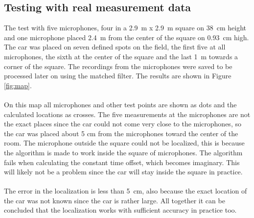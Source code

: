 \documentclass[final]{scrreprt} %
\begin{document}
\subsection{Testing with real measurement data}
The test with five microphones, four in a \SI{2.9}{\metre} x \SI{2.9}{\metre} square on \SI{38}{\centi\metre} height and one microphone placed \SI{2.4}{\metre} from the center of the square on \SI{0.93}{\centi\metre} high.
The car was placed on seven defined spots on the field, the first five at all microphones, the sixth at the center of the square and the last \SI{1}{\metre} towards a corner of the square.
The recordings from the microphones were saved to be processed later on using the matched filter.
The results are shown in Figure \ref{fig:map}.
\\ \\
On this map all microphones and other test points are shown as dots and the calculated locations as crosses.
The five measurements at the microphones are not the exact places since the car could not come very close to the microphones, so the car was placed about 5 cm from the microphones toward the center of the room.
The microphone outside the square could not be localized, this is because the algorithm is made to work inside the square of microphones.
The algorithm fails when calculating the constant time offset, which becomes imaginary.
This will likely not be a problem since the car will stay inside the square in practice.
\\ \\
The error in the localization is less than \SI{5}{\centi\metre}, also because the exact location of the car was not known since the car is rather large.
All together it can be concluded that the localization works with sufficient accuracy in practice too.
\end{document}
